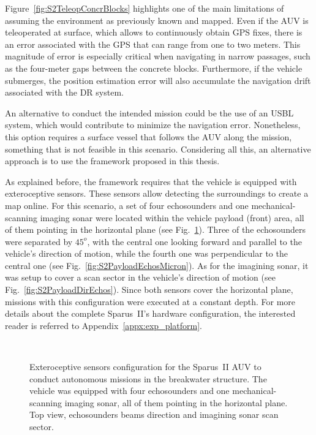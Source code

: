 Figure~\ref{fig:S2TeleopConcrBlocks} highlights one of the main limitations of
assuming the environment as previously known and mapped. Even if the \ac{AUV} is
teleoperated at surface, which allows to continuously obtain GPS fixes, there is
an error associated with the GPS that can range from one to two meters. This
magnitude of error is especially critical when navigating in narrow passages,
such as the four-meter gaps between the concrete blocks. Furthermore, if the
vehicle submerges, the position estimation error will also accumulate the
navigation drift associated with the \acf{DR} system. 

An alternative to conduct the intended mission could be the use of an \ac{USBL}
system, which would contribute to minimize the navigation error. Nonetheless,
this option requires a surface vessel that follows the \ac{AUV} along the
mission, something that is not feasible in this scenario. Considering all this,
an alternative approach is to use the framework proposed in this thesis.

As explained before, the framework requires that the vehicle is equipped with
exteroceptive sensors. These sensors allow detecting the surroundings to create
a map online. For this scenario, a set of four echosounders and one
mechanical-scanning imaging sonar were located within the vehicle payload
(front) area, all of them pointing in the horizontal plane (see
Fig.~\ref{fig:S2EchosMicronPayloadConf}). Three of the echosounders were
separated by $45^o$, with the central one looking forward and parallel to the
vehicle's direction of motion, while the fourth one was perpendicular to the
central one (see Fig.~\ref{fig:S2PayloadEchosMicron}). As for the imagining
sonar, it was setup to cover a scan sector in the vehicle's direction of motion
(see Fig.~\ref{fig:S2PayloadDirEchos}). Since both sensors cover the horizontal
plane, missions with this configuration were executed at a constant depth. For
more details about the complete Sparus~II's hardware configuration, the
interested reader is referred to Appendix~\ref{appx:exp_platform}.


\begin{figure}[htbp]
\myfloatalign
	\\%
\caption[Exteroceptive sensors configuration for the Sparus~II AUV to
conduct autonomous missions in the breakwater structure.] 
{Exteroceptive sensors configuration for the Sparus~II AUV to
conduct autonomous missions in the breakwater structure.
\protect {} The vehicle was equipped with four
echosounders and one mechanical-scanning imaging sonar, all of them pointing in
the horizontal plane. \protect {} Top view,
echosounders beams direction and imagining sonar scan sector.}
\label{fig:S2EchosMicronPayloadConf}
\end{figure}

